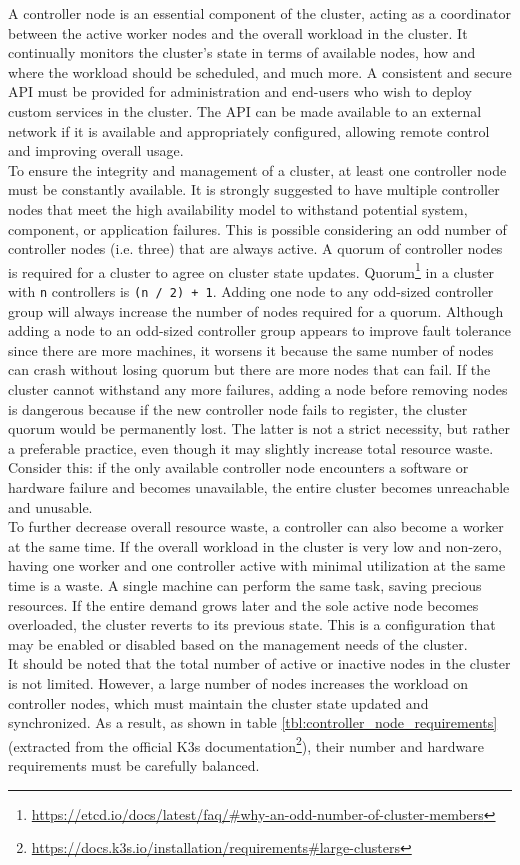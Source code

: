 A controller node is an essential component of the cluster, acting as a
coordinator between the active worker nodes and the overall workload in the
cluster. It continually monitors the cluster's state in terms of available nodes,
how and where the workload should be scheduled, and much more. A consistent and
secure API must be provided for administration and end-users who wish to deploy
custom services in the cluster. The API can be made available to an external network
if it is available and appropriately configured, allowing remote control and
improving overall usage. \\ %
To ensure the integrity and management of a cluster, at least one controller node
must be constantly available. It is strongly suggested to have multiple
controller nodes that meet the high availability model to withstand potential
system, component, or application failures. This is possible considering an odd number
of controller nodes (i.e. three) that are always active. A quorum of controller nodes
is required for a cluster to agree on cluster state updates. Quorum\footnote{\url{https://etcd.io/docs/latest/faq/\#why-an-odd-number-of-cluster-members}}
in a cluster with \texttt{n} controllers is \texttt{(n / 2) + 1}. Adding one node
to any odd-sized controller group will always increase the number of nodes required
for a quorum. Although adding a node to an odd-sized controller group appears to
improve fault tolerance since there are more machines, it worsens it because the
same number of nodes can crash without losing quorum but there are more nodes that
can fail. If the cluster cannot withstand any more failures, adding a node before
removing nodes is dangerous because if the new controller node fails to register,
the cluster quorum would be permanently lost. The latter is not a strict necessity,
but rather a preferable practice, even though it may slightly increase total resource
waste. Consider this: if the only available controller node encounters a software
or hardware failure and becomes unavailable, the entire cluster becomes
unreachable and unusable.\\ %
To further decrease overall resource waste, a controller can also become a
worker at the same time. If the overall workload in the cluster is very low and non-zero,
having one worker and one controller active with minimal utilization at the same
time is a waste. A single machine can perform the same task, saving precious
resources. If the entire demand grows later and the sole active node becomes overloaded,
the cluster reverts to its previous state. This is a configuration that may be enabled
or disabled based on the management needs of the cluster. \\ %
It should be noted that the total number of active or inactive nodes in the cluster
is not limited. However, a large number of nodes increases the workload on controller
nodes, which must maintain the cluster state updated and synchronized. As a result,
as shown in table \ref{tbl:controller_node_requirements} (extracted from the official
K3s documentation\footnote{\url{https://docs.k3s.io/installation/requirements\#large-clusters}}),
their number and hardware requirements must be carefully balanced.

